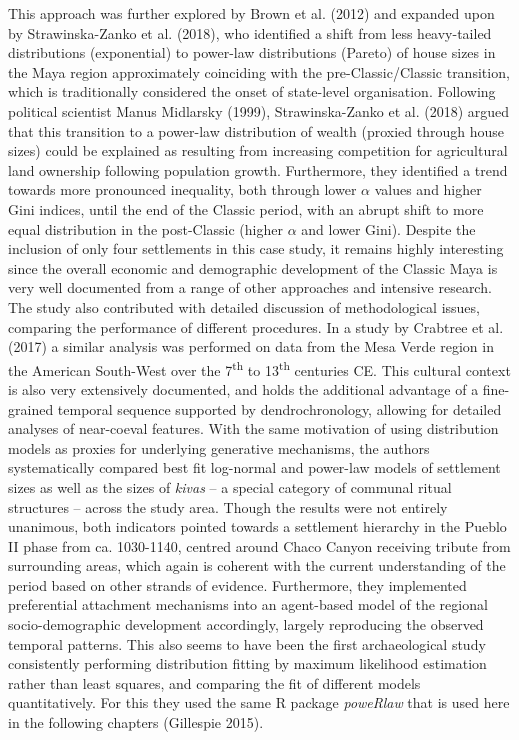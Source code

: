 \documentclass[
  12pt,
  a4paper, twoside]{book}
\begin{document}
This approach was further explored by Brown et al. (2012) and expanded upon by Strawinska-Zanko et al. (2018), who identified a shift from less heavy-tailed distributions (exponential) to power-law distributions (Pareto) of house sizes in the Maya region approximately coinciding with the pre-Classic/Classic transition, which is traditionally considered the onset of state-level organisation. Following political scientist Manus Midlarsky (1999), Strawinska-Zanko et al. (2018) argued that this transition to a power-law distribution of wealth (proxied through house sizes) could be explained as resulting from increasing competition for agricultural land ownership following population growth. Furthermore, they identified a trend towards more pronounced inequality, both through lower \(\alpha\) values and higher Gini indices, until the end of the Classic period, with an abrupt shift to more equal distribution in the post-Classic (higher \(\alpha\) and lower Gini). Despite the inclusion of only four settlements in this case study, it remains highly interesting since the overall economic and demographic development of the Classic Maya is very well documented from a range of other approaches and intensive research. The study also contributed with detailed discussion of methodological issues, comparing the performance of different procedures. In a study by Crabtree et al. (2017) a similar analysis was performed on data from the Mesa Verde region in the American South-West over the 7\textsuperscript{th} to 13\textsuperscript{th} centuries CE. This cultural context is also very extensively documented, and holds the additional advantage of a fine-grained temporal sequence supported by dendrochronology, allowing for detailed analyses of near-coeval features. With the same motivation of using distribution models as proxies for underlying generative mechanisms, the authors systematically compared best fit log-normal and power-law models of settlement sizes as well as the sizes of \emph{kivas} -- a special category of communal ritual structures -- across the study area. Though the results were not entirely unanimous, both indicators pointed towards a settlement hierarchy in the Pueblo II phase from ca. 1030-1140, centred around Chaco Canyon receiving tribute from surrounding areas, which again is coherent with the current understanding of the period based on other strands of evidence. Furthermore, they implemented preferential attachment mechanisms into an agent-based model of the regional socio-demographic development accordingly, largely reproducing the observed temporal patterns. This also seems to have been the first archaeological study consistently performing distribution fitting by maximum likelihood estimation rather than least squares, and comparing the fit of different models quantitatively. For this they used the same R package \emph{poweRlaw} that is used here in the following chapters (Gillespie 2015).
\end{document}
